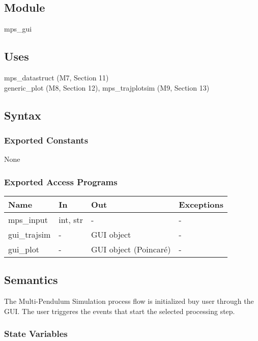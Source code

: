 \documentclass[12pt, titlepage]{article}
\newcommand{\progname}{Multi-Pendulum Simulation }
\begin{document}
\subsection{Module}

mps\_gui

\subsection{Uses}

mps\_datastruct (M7, Section 11)\\
generic\_plot (M8, Section 12), mps\_trajplotsim (M9, Section 13) 

\subsection{Syntax}

\subsubsection{Exported Constants}

None

\subsubsection{Exported Access Programs}

\begin{center}
\begin{tabular}{p{2cm} p{4cm} p{4cm} p{2cm}}
\hline
\textbf{Name} & \textbf{In} & \textbf{Out} & \textbf{Exceptions} \\
\hline
mps\_input & int, str & - & - \\
gui\_trajsim & - & GUI object & - \\
gui\_plot & - & GUI object (Poincar\'{e}) & - \\
\hline
\end{tabular}
\end{center}

\subsection{Semantics}

The \progname process flow is initialized buy user through the GUI. 
The user triggeres the events that start the selected processing step.

\subsubsection{State Variables}
\end{document}

